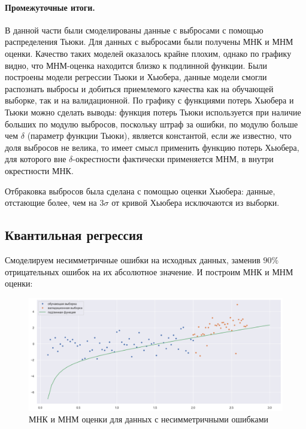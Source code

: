 \documentclass[a4paper,12pt]{article}
\begin{document}
\paragraph{Промежуточные итоги.\\}

В данной части были смоделированы данные с выбросами с помощью распределения Тьюки. Для данных с выбросами были получены МНК и МНМ оценки. Качество таких моделей оказалось крайне плохим, однако по графику видно, что МНМ-оценка находится близко к подлинной функции. Были построены модели регрессии Тьюки и Хьюбера, данные модели смогли распознать выбросы и добиться приемлемого качества как на обучающей выборке, так и на валидационной. По графику с функциями потерь Хьюбера и Тьюки можно сделать выводы: функция потерь Тьюки используется при наличие больших по модулю выбросов, поскольку штраф за ошибки, по модулю больше чем $\delta$ (параметр функции Тьюки), является константой, если же известно, что доля выбросов не велика, то имеет смысл применить функцию потерь Хьюбера, для которого вне $\delta$-окрестности фактически применяется МНМ, в внутри окрестности МНК.

Отбраковка выбросов была сделана с помощью оценки Хьюбера: данные, отстающие более, чем на $3\sigma$ от кривой Хьюбера исключаются из выборки.



\subsection{Квантильная регрессия}

Смоделируем несимметричные ошибки на исходных данных, заменив $90\%$ отрицательных ошибок на их абсолютное значение. И построим МНК и МНМ оценки:
\begin{figure}[H]
    \centering
    \includegraphics[width=0.9\linewidth]{src/img/несимметричные_ошибки.png}
    \caption{МНК и МНМ оценки для данных с несимметричными ошибками}
\end{figure}
\end{document}

